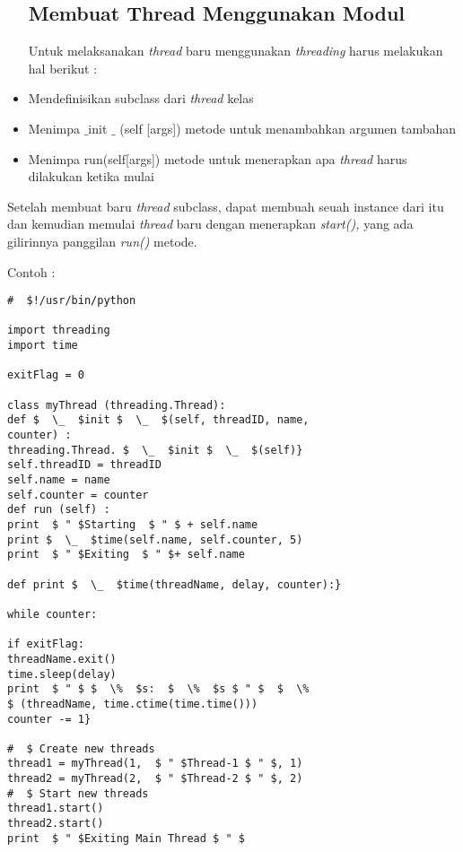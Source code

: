 \documentclass [12pt,a4paper,notitlepage,oneside,bahasa]{article}
\begin{document}
\begin{itemize}
\subsection {Membuat Thread Menggunakan Modul} \par
\hspace*{0.5in} Untuk melaksanakan \textit{thread}\textit{ }baru menggunakan\textit{ threading} harus melakukan hal berikut : \par
\item Mendefinisikan subclass dari \textit{thread} kelas \par
\item Menimpa  $  \_  $init $  \_  $ (self [args]) metode untuk menambahkan argumen tambahan \par
\item Menimpa run(self[args]) metode untuk menerapkan apa \textit{thread} harus dilakukan ketika mulai 
\end{itemize}

\vspace{12pt}
\hspace*{0.5in} Setelah membuat baru \textit{thread} subclass, dapat membuah seuah instance dari itu dan kemudian memulai \textit{thread} baru dengan menerapkan \textit{start(),} yang ada gilirinnya panggilan \textit{run()} metode. \par
\vspace{50pt}

Contoh :
\begin{verbatim} 
#  $!/usr/bin/python

import threading
import time

exitFlag = 0

class myThread (threading.Thread): 
def $  \_  $init $  \_  $(self, threadID, name, 
counter) :
threading.Thread. $  \_  $init $  \_  $(self)} 
self.threadID = threadID
self.name = name 
self.counter = counter 
def run (self) :
print  $ " $Starting  $ " $ + self.name 
print $  \_  $time(self.name, self.counter, 5)
print  $ " $Exiting  $ " $+ self.name

def print $  \_  $time(threadName, delay, counter):} 

while counter:

if exitFlag: 
threadName.exit() 
time.sleep(delay) 
print  $ " $ $  \%  $s:  $  \%  $s $ " $  $  \%  
$ (threadName, time.ctime(time.time()))
counter -= 1} 

#  $ Create new threads
thread1 = myThread(1,  $ " $Thread-1 $ " $, 1)
thread2 = myThread(2,  $ " $Thread-2 $ " $, 2)
#  $ Start new threads
thread1.start()
thread2.start()
print  $ " $Exiting Main Thread $ " $
\end{verbatim}
\end{document}

